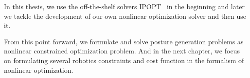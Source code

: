 In this thesis, we use the off-the-shelf solvers IPOPT~\cite{wachter:mathprog:2006} in the beginning and later we tackle the development of our own nonlinear optimization solver and then use it.

From this point forward, we formulate and solve posture generation problems as nonlinear constrained optimization problem.
And in the next chapter, we focus on formulating several robotics constraints and cost function in the formalism of nonlinear optimization.
